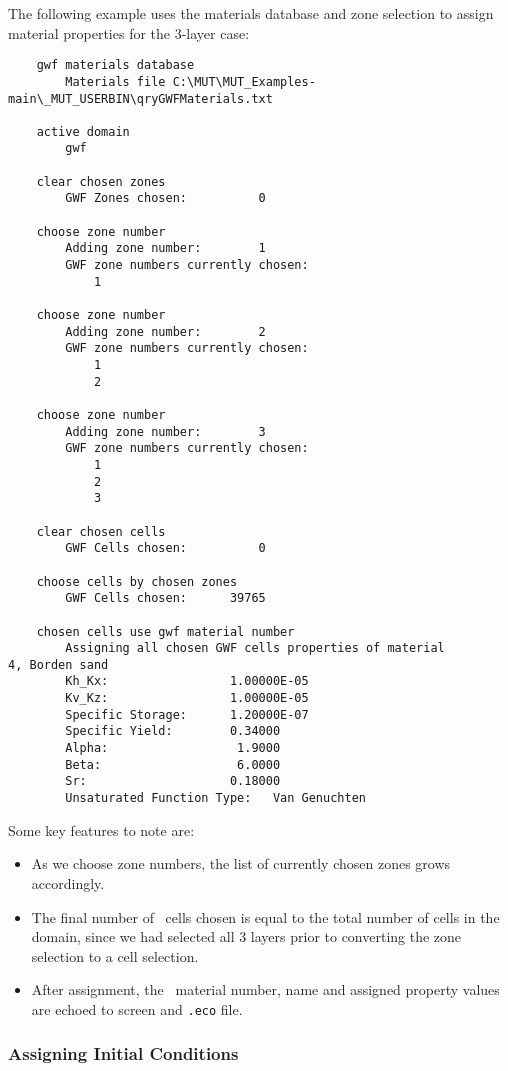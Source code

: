 The following example uses the materials database and zone selection to assign material properties for the 3-layer case:

\begin{verbatim}
    gwf materials database
    	Materials file C:\MUT\MUT_Examples-main\_MUT_USERBIN\qryGWFMaterials.txt

    active domain
    	gwf

    clear chosen zones
    	GWF Zones chosen:          0

    choose zone number
    	Adding zone number:        1
    	GWF zone numbers currently chosen:
    	    1

    choose zone number
    	Adding zone number:        2
    	GWF zone numbers currently chosen:
    	    1
    	    2

    choose zone number
    	Adding zone number:        3
    	GWF zone numbers currently chosen:
    	    1
    	    2
    	    3

    clear chosen cells
    	GWF Cells chosen:          0

    choose cells by chosen zones
    	GWF Cells chosen:      39765

    chosen cells use gwf material number
    	Assigning all chosen GWF cells properties of material               4, Borden sand
    	Kh_Kx:                 1.00000E-05
    	Kv_Kz:                 1.00000E-05
    	Specific Storage:      1.20000E-07
    	Specific Yield:        0.34000
    	Alpha:                  1.9000
    	Beta:                   6.0000
    	Sr:                    0.18000
    	Unsaturated Function Type:   Van Genuchten
\end{verbatim} 

Some key features to note are:
\begin{itemize}
    \item As we choose zone numbers, the list of currently chosen zones grows accordingly.
    \item The final number of \gwf\ cells chosen is equal to the total number of cells in the domain, since we had selected all 3 layers prior to converting the  zone selection to a cell selection.
    \item After assignment, the \gwf\ material number, name and assigned property values are echoed to screen and \texttt{.eco} file.
\end{itemize}

\subsubsection{Assigning Initial Conditions}  

